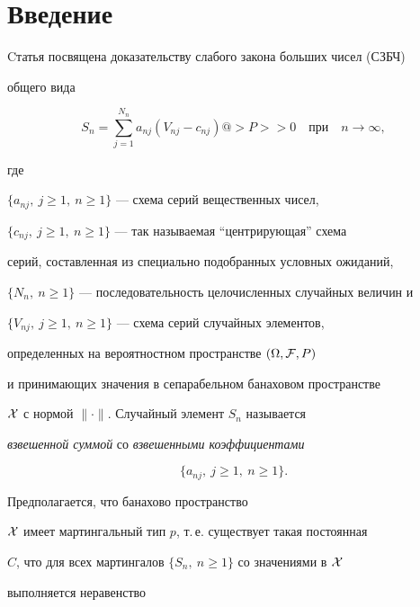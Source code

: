 \label{begin}





\section*{Введение}





Cтатья посвящена доказательству слабого закона больших чисел (СЗБЧ)


общего вида


$$


S_n= \sum^{N_n}_{j=1} a_{nj}


(V_{nj}-c_{nj}) @>{P}>> 0 \quad \text{при} \quad


n\to\infty,


$$


где


$\{a_{nj},\ j \geq 1,\ n \geq1\}$ --- схема серий вещественных чисел, 


$\{c_{nj},\ j \geq 1,\ n \geq 1\}$ --- так называемая ``центрирующая'' схема 


серий, составленная из специально подобранных условных ожиданий,


$\{N_n,\ n\geq 1\}$ --- последовательность целочисленных случайных величин и 


$\{V_{nj},\ j \geq 1,\ n \geq 1\}$ --- схема серий случайных элементов,


определенных на вероятностном пространстве $(\Omega, {\cal F},P)$


и принимающих значения в сепарабельном банаховом пространстве


${\cal X}$ с нормой $\|\cdot\|$. Случайный элемент $S_n$ называется


{\it взвешенной суммой} со {\it взвешенными коэффициентами}


$$


\{a_{nj},\ j \geq 1,\ n \geq 1\}.


$$





Предполагается, что банахово пространство


${\cal X}$ имеет мартингальный тип $p$, т.\,е. существует такая постоянная


$C$, что для всех мартингалов $\{S_n,\ n \geq 1\}$ со значениями в ${\cal X}$


выполняется неравенство


$$ 


